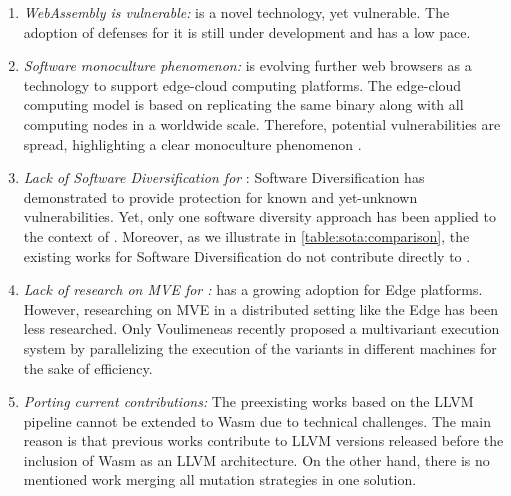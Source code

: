 \begin{enumerate}
    \item \emph{WebAssembly is vulnerable:} \wasm is a novel technology, yet vulnerable. The adoption of defenses for it is still under development \cite{Narayan2021Swivel, johnson2021} and has a low pace.
    
    \item \emph{Software monoculture phenomenon:}  \wasm is evolving further web browsers as a technology to support edge-cloud computing platforms.
    The edge-cloud computing model is based on replicating the same binary along with all computing nodes in a worldwide scale. Therefore, potential vulnerabilities are spread, highlighting a clear monoculture phenomenon \cite{Harrand1650630}. 

    \item \emph{Lack of Software Diversification for \wasm}:  Software Diversification has demonstrated to provide protection for known and yet-unknown vulnerabilities. Yet, only one software diversity approach has been applied to the context of \wasm \cite{wobfuscator}. 
    Moreover, as we illustrate in \autoref{table:sota:comparison}, the existing works for Software Diversification do not contribute directly to \wasm.
    
    \item \emph{Lack of research on MVE for \wasm:} \wasm has a growing adoption for Edge platforms. However, researching on MVE in a distributed setting like the Edge has been less researched. Only Voulimeneas \etal \cite{voulimeneas2021dmvx} recently proposed a multivariant execution system by parallelizing the execution of the variants in different machines for the sake of efficiency. 

    
    \item \emph{Porting current contributions:} 
    The preexisting works based on the LLVM pipeline cannot be extended to Wasm due to technical challenges. The main reason is that previous works contribute to LLVM versions released before the inclusion of Wasm as an LLVM architecture. 
    On the other hand, there is no mentioned work merging all mutation strategies in one solution.

\end{enumerate}







